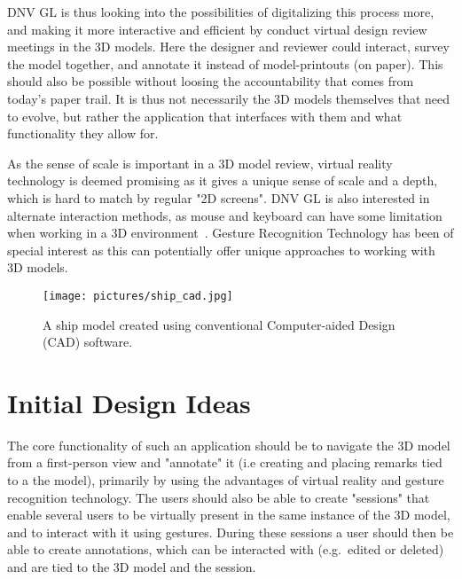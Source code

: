 DNV GL is thus looking into the possibilities of digitalizing this process more, and making it more interactive and efficient by 
conduct virtual design review meetings in the 3D models. Here the designer and reviewer could interact, 
survey the model together, and annotate it instead of model-printouts (on paper). This should also be possible 
without loosing the accountability that comes from today’s paper trail. It is thus not necessarily the 3D models themselves that 
need to evolve, but rather the application that interfaces with them and what functionality they allow for.  

As the sense of scale is important in a 3D model review, virtual reality technology is deemed promising as it gives a unique sense of scale
and a depth, which is hard to match by regular "2D screens". 
DNV GL is also interested in alternate interaction methods, as mouse and keyboard can have some limitation when working in a 3D environment~\citep{Rautaray2015}. 
Gesture Recognition Technology has been of special interest as this can potentially offer unique approaches to working with 3D models.

\begin{figure}%
	\texttt{[image: pictures/ship\_cad.jpg]}
	\caption[A ship model created using conventional CAD software.]{A ship model created using conventional Computer-aided Design (CAD) software.~\cite{IMO}}
	\label{fig:ship_cad}
\end{figure} 


\section{Initial Design Ideas}
\label{sec:initial_design}
The core functionality of such an application should be to navigate the 3D model from a first-person view and "annotate" it (i.e creating and placing remarks tied to a the model), 
primarily by using the advantages of virtual reality and gesture recognition technology. 
The users should also be able to create "sessions" that enable several users to be virtually present 
in the same instance of the 3D model, and to interact with it using gestures. During these sessions a user should then be able to create annotations, 
which can be interacted with (e.g.~edited or deleted) and are tied to the 3D model and the session. 

